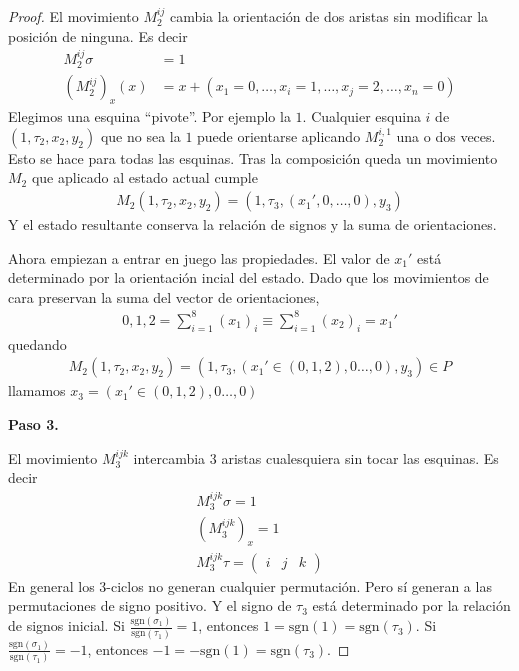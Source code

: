 \documentclass{article}
\theoremstyle{definition}
\newcommand{\sgn}[1]{\text{sgn}\left(#1\right)}
\newcommand{\comillas}[1]{``#1''}
\begin{document}
\begin{proof}
    El movimiento $M_2^{ij}$ cambia la orientación de dos aristas sin modificar la posición de ninguna. Es decir
    \begin{align*}
        M_2^{ij}\sigma  & =1                                             \\
        (M_2^{ij})_x(x) & =x+(x_1=0,\dots,x_i=1,\dots,x_j=2,\dots,x_n=0)
    \end{align*}
    Elegimos una esquina \comillas{pivote}. Por ejemplo la $1$. Cualquier esquina $i$ de $(1,\tau_2,x_2,y_2)$ que no sea la $1$ puede orientarse aplicando $M_2^{i,1}$ una o dos veces. Esto se hace para todas las esquinas. Tras la composición queda un movimiento $M_2$ que aplicado al estado actual cumple
    \begin{align*}
        M_2(1,\tau_2,x_2,y_2)=(1,\tau_3,(x_1',0,\dots,0),y_3)
    \end{align*}
    Y el estado resultante conserva la relación de signos y la suma de orientaciones.

    Ahora empiezan a entrar en juego las propiedades. El valor de $x_1'$ está determinado por la orientación incial del estado. Dado que los movimientos de cara preservan la suma del vector de orientaciones,
    \begin{align*}
        0,1,2=\sum_{i=1}^8 (x_1)_i\equiv \sum_{i=1}^8 (x_2)_i=x_1'
    \end{align*}
    quedando
    \begin{align*}
        M_2(1,\tau_2,x_2,y_2)=(1,\tau_3,(x_1'\in(0,1,2),0\dots,0),y_3)\in P
    \end{align*}
    llamamos $x_3=(x_1'\in(0,1,2),0\dots,0)$

    \noindent\textbf{Paso 3.}

    El movimiento $M_3^{ijk}$ intercambia $3$ aristas cualesquiera sin tocar las esquinas. Es decir
    \begin{align*}
        M_3^{ijk}\sigma=1 \\
        (M_3^{ijk})_x=1   \\
        M_3^{ijk}\tau=\begin{pmatrix}
                          i & j & k
                      \end{pmatrix}
    \end{align*}
    En general los 3-ciclos no generan cualquier permutación. Pero sí generan a las permutaciones de signo positivo. Y el signo de $\tau_3$ está determinado por la relación de signos inicial. Si $\frac{\sgn{\sigma_1}}{\sgn{\tau_1}}=1$, entonces $1=\sgn{1}=\sgn{\tau_3}$. Si $\frac{\sgn{\sigma_1}}{\sgn{\tau_1}}=-1$, entonces $-1=-\sgn{1}=\sgn{\tau_3}$.
    

\end{proof}
\end{document}
